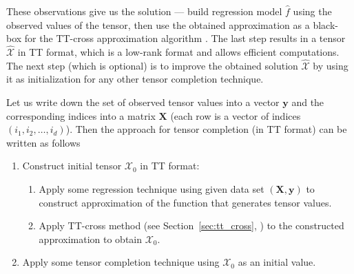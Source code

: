 These observations give us the solution --- build regression model $\widehat{f}$ using the observed values of the tensor, then use the obtained approximation as a black-box for the TT-cross approximation algorithm \citep{oseledets2010tt}.
The last step results in a tensor $\widehat{\mathcal{X}}$ in TT format, which is a low-rank format and allows efficient computations.
The next step (which is optional) is to improve the obtained solution $\widehat{\mathcal{X}}$ by using it as initialization for any other tensor completion technique.


Let us write down the set of observed tensor values into a vector $\mathbf{y}$
and the corresponding indices into a matrix $\mathbf{X}$ (each row is a vector of indices
$(i_1, i_2, \ldots, i_d)$).
Then the approach for tensor completion (in TT format) can be
written as follows

\begin{enumerate}
    \item Construct initial tensor $\mathcal{X}_0$ in TT format:
        \begin{enumerate}
        \item Apply some regression technique using given data set $(\mathbf{X}, \mathbf{y})$ to construct approximation of the function that generates tensor values.
        \item Apply TT-cross method (see Section~\ref{sec:tt_cross}, \citep{oseledets2010tt}) to the constructed approximation to obtain $\mathcal{X}_0$.
        \end{enumerate}
    \item Apply some tensor completion technique using $\mathcal{X}_0$
    as an initial value.
\end{enumerate}

